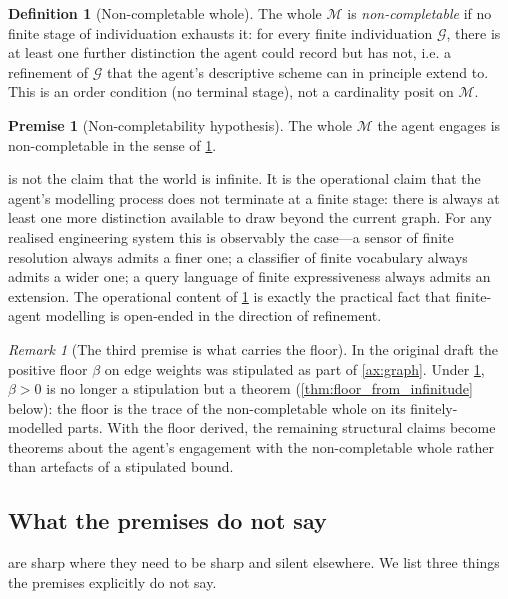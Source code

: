 \documentclass[11pt,a4paper]{article}
\theoremstyle{thmstyle}
\theoremstyle{definition}
\newtheorem{definition}[theorem]{Definition}
\newtheorem{axiom}{Premise}
\theoremstyle{remark}
\newtheorem{remark}[theorem]{Remark}
\newcommand{\Graph}{\mathcal{G}}
\newcommand{\floor}{\beta}
\begin{document}
\begin{definition}[Non-completable whole]
\label{def:noncompletable}
The whole $\mathcal{M}$ is \emph{non-completable} if no finite
stage of individuation exhausts it: for every finite individuation
$\Graph$, there is at least one further distinction the agent could
record but has not, i.e. a refinement of $\Graph$ that the agent's
descriptive scheme can in principle extend to. This is an order
condition (no terminal stage), not a cardinality posit on
$\mathcal{M}$.
\end{definition}

\begin{axiom}[Non-completability hypothesis]
\label{ax:noncompletable}
The whole $\mathcal{M}$ the agent engages is non-completable in the
sense of \cref{def:noncompletable}.
\end{axiom}

 is not the claim that the world is
infinite. It is the operational claim that the agent's modelling
process does not terminate at a finite stage: there is always at
least one more distinction available to draw beyond the current
graph. For any realised engineering system this is observably the
case---a sensor of finite resolution always admits a finer one; a
classifier of finite vocabulary always admits a wider one; a query
language of finite expressiveness always admits an extension. The
operational content of \cref{ax:noncompletable} is exactly the
practical fact that finite-agent modelling is open-ended in the
direction of refinement.

\begin{remark}[The third premise is what carries the floor]
\label{rem:third_carries}
In the original draft the positive floor $\floor$ on edge weights
was stipulated as part of \cref{ax:graph}. Under
\cref{ax:noncompletable}, $\floor > 0$ is no longer a stipulation
but a theorem (\cref{thm:floor_from_infinitude} below): the floor
is the trace of the non-completable whole on its finitely-modelled
parts. With the floor derived, the remaining structural claims
become theorems about the agent's engagement with the
non-completable whole rather than artefacts of a stipulated bound.
\end{remark}

\subsection{What the premises do not say}

 are sharp where they need to be sharp and
silent elsewhere. We list three things the premises explicitly do
not say.
\end{document}
